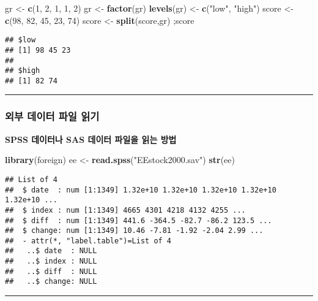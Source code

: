\documentclass[]{article}
\newenvironment{Shaded}{\begin{snugshade}}{\end{snugshade}}
\newcommand{\KeywordTok}[1]{\textcolor[rgb]{0.13,0.29,0.53}{\textbf{#1}}}
\newcommand{\DecValTok}[1]{\textcolor[rgb]{0.00,0.00,0.81}{#1}}
\newcommand{\StringTok}[1]{\textcolor[rgb]{0.31,0.60,0.02}{#1}}
\newcommand{\NormalTok}[1]{#1}
\begin{document}
\begin{Shaded}
\begin{Highlighting}[]
\NormalTok{gr <-}\StringTok{ }\KeywordTok{c}\NormalTok{(}\DecValTok{1}\NormalTok{, }\DecValTok{2}\NormalTok{, }\DecValTok{1}\NormalTok{, }\DecValTok{1}\NormalTok{, }\DecValTok{2}\NormalTok{)}
\NormalTok{gr <-}\StringTok{ }\KeywordTok{factor}\NormalTok{(gr)}
\KeywordTok{levels}\NormalTok{(gr) <-}\StringTok{ }\KeywordTok{c}\NormalTok{(}\StringTok{"low"}\NormalTok{, }\StringTok{"high"}\NormalTok{)}
\NormalTok{score <-}\StringTok{ }\KeywordTok{c}\NormalTok{(}\DecValTok{98}\NormalTok{, }\DecValTok{82}\NormalTok{, }\DecValTok{45}\NormalTok{, }\DecValTok{23}\NormalTok{, }\DecValTok{74}\NormalTok{)}
\NormalTok{score <-}\StringTok{ }\KeywordTok{split}\NormalTok{(score,gr) ;score}
\end{Highlighting}
\end{Shaded}

\begin{verbatim}
## $low
## [1] 98 45 23
## 
## $high
## [1] 82 74
\end{verbatim}

\begin{center}\rule{0.5\linewidth}{\linethickness}\end{center}

\subsubsection{외부 데이터 파일 읽기}\label{---}

\textbf{SPSS 데이터나 SAS 데이터 파일을 읽는 방법}

\begin{Shaded}
\begin{Highlighting}[]
\KeywordTok{library}\NormalTok{(foreign)}
\NormalTok{ee <-}\StringTok{ }\KeywordTok{read.spss}\NormalTok{(}\StringTok{"EEstock2000.sav"}\NormalTok{)}
\KeywordTok{str}\NormalTok{(ee)}
\end{Highlighting}
\end{Shaded}

\begin{verbatim}
## List of 4
##  $ date  : num [1:1349] 1.32e+10 1.32e+10 1.32e+10 1.32e+10 1.32e+10 ...
##  $ index : num [1:1349] 4665 4301 4218 4132 4255 ...
##  $ diff  : num [1:1349] 441.6 -364.5 -82.7 -86.2 123.5 ...
##  $ change: num [1:1349] 10.46 -7.81 -1.92 -2.04 2.99 ...
##  - attr(*, "label.table")=List of 4
##   ..$ date  : NULL
##   ..$ index : NULL
##   ..$ diff  : NULL
##   ..$ change: NULL
\end{verbatim}

\begin{center}\rule{0.5\linewidth}{\linethickness}\end{center}
\end{document}
